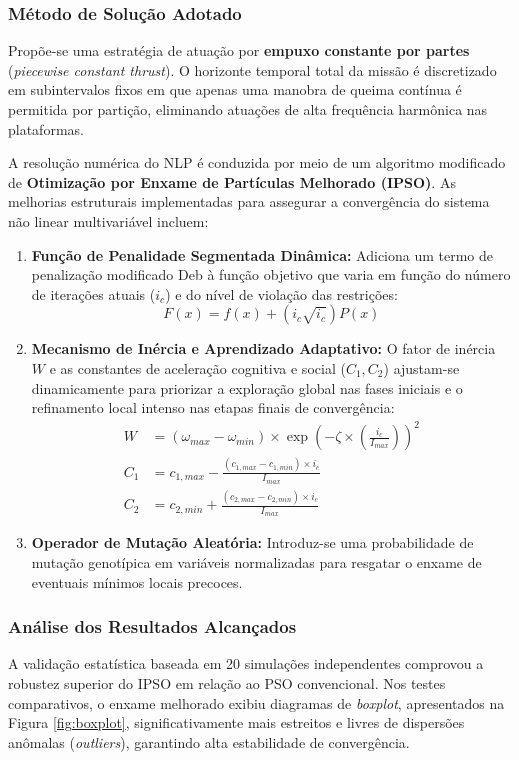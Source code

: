 \documentclass[a4paper, 12pt]{article}%
\begin{document}
\subsubsection*{Método de Solução Adotado}
Propõe-se uma estratégia de atuação por \textbf{empuxo constante por partes} (\textit{piecewise constant thrust}). O horizonte temporal total da missão é discretizado em subintervalos fixos em que apenas uma manobra de queima contínua é permitida por partição, eliminando atuações de alta frequência harmônica nas plataformas.

A resolução numérica do NLP é conduzida por meio de um algoritmo modificado de \textbf{Otimização por Enxame de Partículas Melhorado (IPSO)}. As melhorias estruturais implementadas para assegurar a convergência do sistema não linear multivariável incluem:
\begin{enumerate}
    \item \textbf{Função de Penalidade Segmentada Dinâmica:} Adiciona um termo de penalização modificado Deb à função objetivo que varia em função do número de iterações atuais ($i_c$) e do nível de violação das restrições:
    \begin{equation}
        F(x) = f(x) + (i_c\sqrt{i_c}) P(x)
    \end{equation}
    \item \textbf{Mecanismo de Inércia e Aprendizado Adaptativo:} O fator de inércia $W$ e as constantes de aceleração cognitiva e social ($C_1, C_2$) ajustam-se dinamicamente para priorizar a exploração global nas fases iniciais e o refinamento local intenso nas etapas finais de convergência:
    \begin{align}
        W &= (\omega_{max}-\omega_{min})\times \exp\left(-\zeta\times\left(\frac{i_c}{I_{max}}\right)\right)^2 \\
        C_1 &= c_{1,max}-\frac{(c_{1,max}-c_{1,min})\times i_c}{I_{max}} \\
        C_2 &= c_{2,min}+\frac{(c_{2,max}-c_{2,min})\times i_c}{I_{max}}
    \end{align}
    \item \textbf{Operador de Mutação Aleatória:} Introduz-se uma probabilidade de mutação genotípica em variáveis normalizadas para resgatar o enxame de eventuais mínimos locais precoces.
\end{enumerate}

\subsubsection*{Análise dos Resultados Alcançados}
A validação estatística baseada em 20 simulações independentes comprovou a robustez superior do IPSO em relação ao PSO convencional. Nos testes comparativos, o enxame melhorado exibiu diagramas de \textit{boxplot}, apresentados na Figura \ref{fig:boxplot}, significativamente mais estreitos e livres de dispersões anômalas (\textit{outliers}), garantindo alta estabilidade de convergência.
\end{document}
